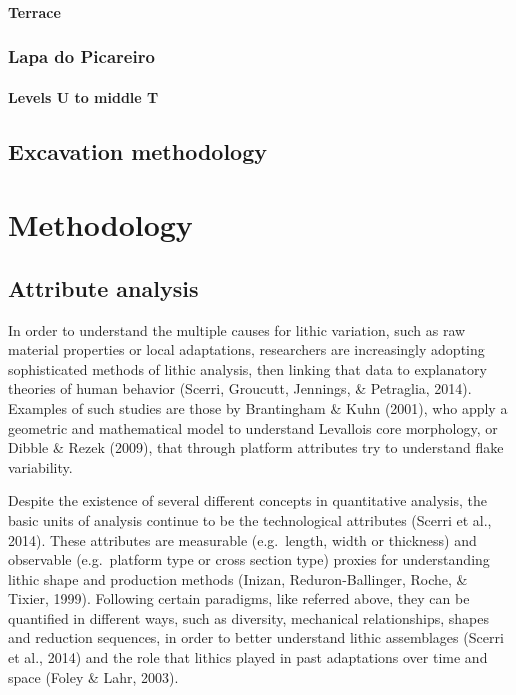 \documentclass[12pt,twoside]{reedthesis}
\begin{document}
\hypertarget{terrace}{%
\subsubsection{Terrace}\label{terrace}}

\hypertarget{lapa-do-picareiro-1}{%
\subsection{Lapa do Picareiro}\label{lapa-do-picareiro-1}}

\hypertarget{levels-u-to-middle-t}{%
\subsubsection{Levels U to middle T}\label{levels-u-to-middle-t}}

\hypertarget{excavation-methodology}{%
\section{Excavation methodology}\label{excavation-methodology}}

\hypertarget{methodology}{%
\chapter{Methodology}\label{methodology}}

\hypertarget{attribute-analysis}{%
\section{Attribute analysis}\label{attribute-analysis}}

In order to understand the multiple causes for lithic variation, such as raw material properties or local adaptations, researchers are increasingly adopting sophisticated methods of lithic analysis, then linking that data to explanatory theories of human behavior (Scerri, Groucutt, Jennings, \& Petraglia, 2014). Examples of such studies are those by Brantingham \& Kuhn (2001), who apply a geometric and mathematical model to understand Levallois core morphology, or Dibble \& Rezek (2009), that through platform attributes try to understand flake variability.

Despite the existence of several different concepts in quantitative analysis, the basic units of analysis continue to be the technological attributes (Scerri et al., 2014). These attributes are measurable (e.g.~length, width or thickness) and observable (e.g.~platform type or cross section type) proxies for understanding lithic shape and production methods (Inizan, Reduron-Ballinger, Roche, \& Tixier, 1999). Following certain paradigms, like referred above, they can be quantified in different ways, such as diversity, mechanical relationships, shapes and reduction sequences, in order to better understand lithic assemblages (Scerri et al., 2014) and the role that lithics played in past adaptations over time and space (Foley \& Lahr, 2003).
\end{document}
